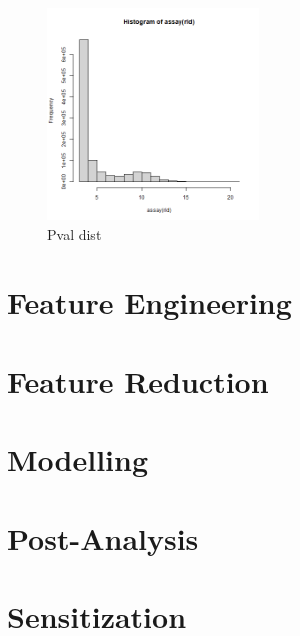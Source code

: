 \begin{figure}[ht]
	\begin{center}
		\includegraphics[width = 0.5\textwidth]{Fig/rld_hist_full.png}
	\end{center}
	\caption{Pval dist}\label{fig:dge_pval}
\end{figure}

\section{Feature Engineering}



\section{Feature Reduction}


\section{Modelling}


\section{Post-Analysis}


\section{Sensitization}
